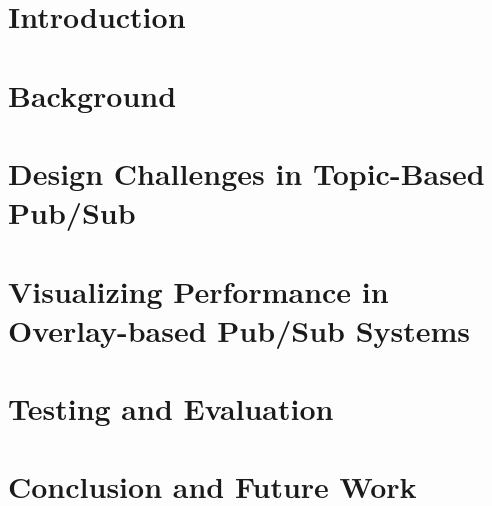 \documentclass[UKenglish, a4paper]{ifimaster}
\begin{document}
\chapter{Introduction}


\chapter{Background}
\label{ch:background}


\chapter{Design Challenges in Topic-Based Pub/Sub}
\label{ch:design-challenges}


\chapter{Visualizing Performance in Overlay-based Pub/Sub Systems}
\label{ch:vizpub}


\chapter{Testing and Evaluation}
\label{ch:evaluation}


\chapter{Conclusion and Future Work}
\label{ch:conclusion}


\backmatter{}
\printbibliography{}
\end{document}
